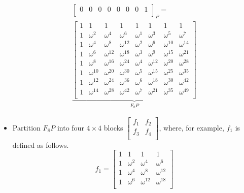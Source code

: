 \documentclass{article}
\begin{document}
\begin{itemize}
\begin{multline*}
{\begin{bmatrix}
                0 & 0 & 0 & 0 & 0 & 0 & 0 & 1\\
            \end{bmatrix}
        }_P =\\ \underbrace{
            \begin{bmatrix}
                1 & 1 & 1 & 1 & 1 & 1 & 1 & 1\\
                1 & \omega^2    & \omega^4    & \omega^6    & \omega^1 & \omega^3    & \omega^5    & \omega^7   \\
                1 & \omega^4    & \omega^8    & \omega^{12} & \omega^2 & \omega^6    & \omega^{10} & \omega^{14}\\
                1 & \omega^6    & \omega^{12} & \omega^{18} & \omega^3 & \omega^9    & \omega^{15} & \omega^{21}\\
                1 & \omega^8    & \omega^{16} & \omega^{24} & \omega^4 & \omega^{12} & \omega^{20} & \omega^{28}\\
                1 & \omega^{10} & \omega^{20} & \omega^{30} & \omega^5 & \omega^{15} & \omega^{25} & \omega^{35}\\
                1 & \omega^{12} & \omega^{24} & \omega^{36} & \omega^6 & \omega^{18} & \omega^{30} & \omega^{42}\\
                1 & \omega^{14} & \omega^{28} & \omega^{42} & \omega^7 & \omega^{21} & \omega^{35} & \omega^{49}\\
            \end{bmatrix}
        }_{F_8P}
    \end{multline*}
    \item Partition $F_8P$ into four $4\times 4$ blocks $
        \begin{bmatrix}
            f_1 & f_2\\
            f_3 & f_4\\
        \end{bmatrix}
    $, where, for example, $f_1$ is defined as follows.
    \begin{equation*}
        f_1 =
        \begin{bmatrix}
            1 & 1 & 1 & 1\\
            1 & \omega^2 & \omega^4    & \omega^6   \\
            1 & \omega^4 & \omega^8    & \omega^{12}\\
            1 & \omega^6 & \omega^{12} & \omega^{18}\\
        \end{bmatrix}
    \end{equation*}

\end{itemize}
\end{document}
